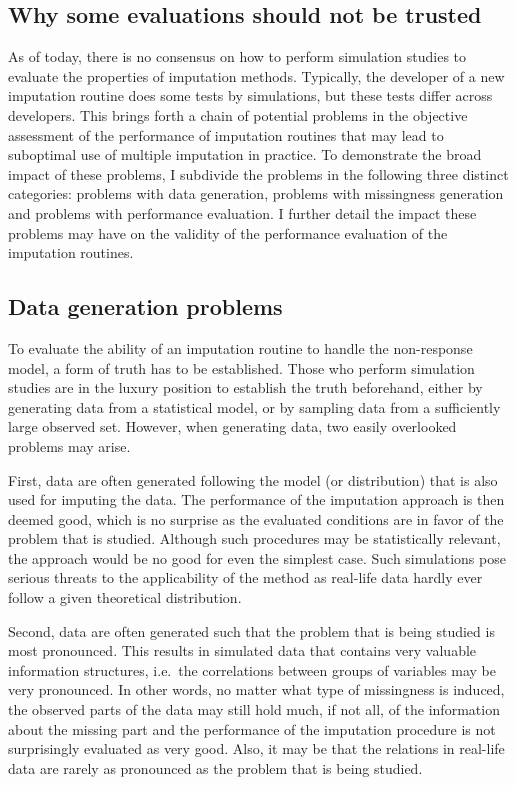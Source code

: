 \documentclass[
]{article}
\begin{document}
\hypertarget{why-some-evaluations-should-not-be-trusted}{%
\subsection{Why some evaluations should not be
trusted}\label{why-some-evaluations-should-not-be-trusted}}

As of today, there is no consensus on how to perform simulation studies
to evaluate the properties of imputation methods. Typically, the
developer of a new imputation routine does some tests by simulations,
but these tests differ across developers. This brings forth a chain of
potential problems in the objective assessment of the performance of
imputation routines that may lead to suboptimal use of multiple
imputation in practice. To demonstrate the broad impact of these
problems, I subdivide the problems in the following three distinct
categories: problems with data generation, problems with missingness
generation and problems with performance evaluation. I further detail
the impact these problems may have on the validity of the performance
evaluation of the imputation routines.

\hypertarget{data-generation-problems}{%
\subsection{Data generation problems}\label{data-generation-problems}}

To evaluate the ability of an imputation routine to handle the
non-response model, a form of truth has to be established. Those who
perform simulation studies are in the luxury position to establish the
truth beforehand, either by generating data from a statistical model, or
by sampling data from a sufficiently large observed set. However, when
generating data, two easily overlooked problems may arise.

First, data are often generated following the model (or distribution)
that is also used for imputing the data. The performance of the
imputation approach is then deemed good, which is no surprise as the
evaluated conditions are in favor of the problem that is studied.
Although such procedures may be statistically relevant, the approach
would be no good for even the simplest case. Such simulations pose
serious threats to the applicability of the method as real-life data
hardly ever follow a given theoretical distribution.

Second, data are often generated such that the problem that is being
studied is most pronounced. This results in simulated data that contains
very valuable information structures, i.e.~the correlations between
groups of variables may be very pronounced. In other words, no matter
what type of missingness is induced, the observed parts of the data may
still hold much, if not all, of the information about the missing part
and the performance of the imputation procedure is not surprisingly
evaluated as very good. Also, it may be that the relations in real-life
data are rarely as pronounced as the problem that is being studied.
\end{document}
